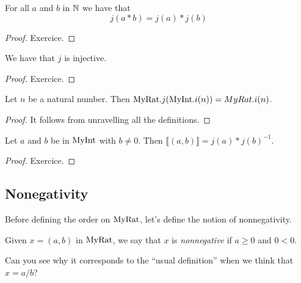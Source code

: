 \begin{lemma}
    \label{MyRat.j_mul}
    \leanok
For all $a$ and $b$ in $\mathbb{N}$ we have that
\[
j(a*b) = j(a) * j(b)
\]
\end{lemma}
\begin{proof}
    \leanok
Exercice.
\end{proof}

\begin{lemma}
    \label{MyRat.j_injective}
    \leanok
    We have that $j$ is injective.
\end{lemma}
\begin{proof}
    \leanok
Exercice.
\end{proof}

\begin{lemma}
    \label{MyRat.j_comp_eq_i}
    \leanok
    Let $n$ be a natural number. Then $\mathrm{MyRat}.j (\mathrm{MyInt}.i (n)) = MyRat.i (n)$.
\end{lemma}
\begin{proof}
    \leanok
It follows from unravelling all the definitions.
\end{proof}

\begin{lemma}
    \label{MyRat.Quotient.mk_def}
    \leanok
    Let $a$ and $b$ be in $\mathrm{MyInt}$ with $b \neq 0$. Then $⟦ (a, b) ⟧ = j(a)*j(b)^{-1}$.
\end{lemma}
\begin{proof}
    \leanok
Exercice.
\end{proof}

\subsection{Nonegativity}

Before defining the order on $\mathrm{MyRat}$, let's define the notion of nonnegativity.

\begin{definition}
    \label{MyRat.IsNonneg}
    \leanok
Given $x = (a,b)$ in $\mathrm{MyRat}$, we say that $x$ is \emph{nonnegative} if $a \geq 0$ and $0 < 0$.

Can you see why it corresponds to the ``usual definition'' when we think that $x = a/b$?
\end{definition}


